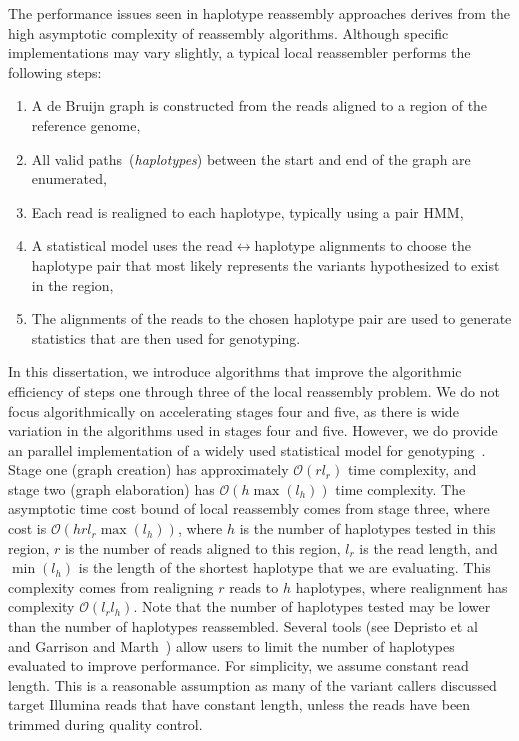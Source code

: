 \documentclass[phd]{ucbthesis}
\begin{document}
The performance issues seen in haplotype reassembly approaches derives from the high asymptotic
complexity of reassembly algorithms. Although specific implementations may vary slightly, a typical
local reassembler performs the following steps:

\begin{enumerate}
\item A de Bruijn graph is constructed from the reads aligned to a region of the reference genome,
\item All valid paths~(\emph{haplotypes}) between the start and end of the graph are enumerated,
\item Each read is realigned to each haplotype, typically using a pair HMM,
\item A statistical model uses the read$\leftrightarrow$haplotype alignments to choose the haplotype pair
that most likely represents the variants hypothesized to exist in the region, 
\item The alignments of the reads to the chosen haplotype pair are used to generate statistics that are
then used for genotyping.
\end{enumerate}

In this dissertation, we introduce algorithms that improve the algorithmic efficiency
of steps one through three of the local reassembly problem.
We do not focus algorithmically on accelerating stages four and five, as there is wide
variation in the algorithms used in stages four and five. However, we do provide an parallel
implementation of a widely used statistical model for genotyping~\cite{li11}. Stage one (graph
creation) has approximately $\mathcal{O}(r l_r)$ time complexity, and stage two (graph elaboration) has
$\mathcal{O}(h \max(l_h))$ time complexity.
The asymptotic time cost bound of local reassembly comes from stage three, where cost is $\mathcal{O}(h r l_r
\max(l_h))$, where $h$ is the number of haplotypes tested in this region, $r$ is the number of reads aligned to this region, $l_r$ is the read length,
and $\min(l_h)$ is the length of the
shortest haplotype that we are evaluating. This complexity comes from realigning $r$ reads to $h$
haplotypes, where realignment has complexity $\mathcal{O}(l_r l_h)$. Note that the number of
haplotypes tested may be lower than the number of haplotypes reassembled. Several tools
(see Depristo et al~\cite{depristo11} and Garrison and Marth~\cite{garrison12}) allow users to limit the number of haplotypes evaluated to improve
performance. For simplicity, we assume constant read length. This is a reasonable assumption as many of the variant
callers discussed target Illumina reads that have constant length, unless the reads have been trimmed
during quality control.
\end{document}
